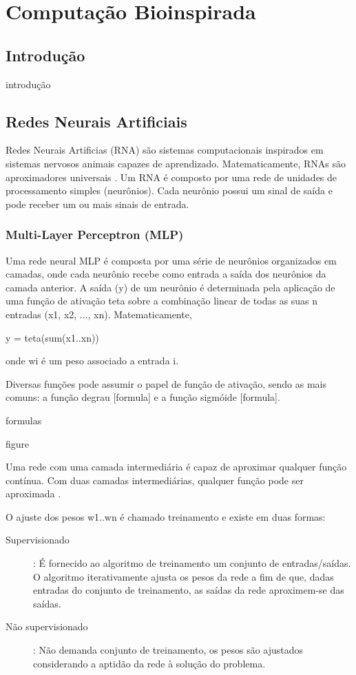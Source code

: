 \chapter{Computação Bioinspirada}
\label{bioinspirada}

\section{Introdução}

introdução

\section{Redes Neurais Artificiais}

Redes Neurais Artificias (RNA) são sistemas computacionais inspirados em sistemas
nervosos animais capazes de aprendizado. Matematicamente, RNAs são aproximadores
universais \cite{hornik89universal}. Um RNA é composto por uma rede de unidades
de processamento simples (neurônios). Cada neurônio possui um sinal de saída e
pode receber um ou mais sinais de entrada.

\subsection{Multi-Layer Perceptron (MLP)}

Uma rede neural MLP é composta por uma série de neurônios organizados em camadas, onde cada neurônio recebe como entrada a saída dos neurônios da camada anterior. A saída (y) de um neurônio é determinada pela aplicação de uma função de ativação teta sobre a combinação linear de todas as suas n entradas (x1, x2, ..., xn). Matematicamente,

y = teta(sum(x1..xn))

onde wi é um peso associado a entrada i.

Diversas funções pode assumir o papel de função de ativação, sendo as mais comuns:
a função degrau [formula] e a função sigmóide [formula].

formulas

figure

Uma rede com uma camada intermediária é capaz de aproximar qualquer função
contínua. Com duas camadas intermediárias, qualquer função pode ser aproximada
\cite{cybenko89mlp}.

O ajuste dos pesos w1..wn é chamado treinamento e existe em duas formas:

\begin{description}
    \item[Supervisionado]: É fornecido ao algoritmo de treinamento um conjunto de entradas/saídas. O algoritmo iterativamente ajusta os pesos da rede a fim de que, dadas entradas do conjunto de treinamento, as saídas da rede aproximem-se das saídas.
    \item[Não supervisionado]: Não demanda conjunto de treinamento, os pesos
são ajustados considerando a aptidão da rede à solução do problema.
\end{description}

